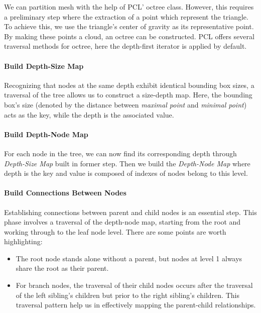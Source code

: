 \documentclass[11pt, a4paper,oneside,chapterprefix=false]{scrbook}
\begin{document}
We can partition mesh with the help of PCL' octree class. However, this requires a preliminary step where the extraction of a point which represent the triangle. To achieve this, we use the triangle's center of gravity as its representative point. By making these points a cloud, an octree can be constructed. PCL offers several traversal methods for octree, here the depth-first iterator is applied by default.

\paragraph{Build Depth-Size Map}

Recognizing that nodes at the same depth exhibit identical bounding box sizes, a traversal of the tree allows us to construct a size-depth map. Here, the bounding box's size (denoted by the distance between \emph{maximal point} and \emph{minimal point}) acts as the key, while the depth is the associated value.

\paragraph{Build Depth-Node Map}

For each node in the tree, we can now find its corresponding depth through \emph{Depth-Size Map} built in former step. Then we build the \emph{Depth-Node Map} where depth is the key and value is composed of indexes of nodes belong to this level.

\paragraph{Build Connections Between Nodes}

Establishing connections between parent and child nodes is an essential step. This phase involves a traversal of the depth-node map, starting from the root and working through to the leaf node level. There are some points are worth highlighting:

\begin{itemize}
	\item The root node stands alone without a parent, but nodes at level 1 always share the root as their parent.
	\item For branch nodes, the traversal of their child nodes occurs after the traversal of the left sibling's children but prior to the right sibling's children. This traversal pattern help us in effectively mapping the parent-child relationships.
\end{itemize}
\end{document}
